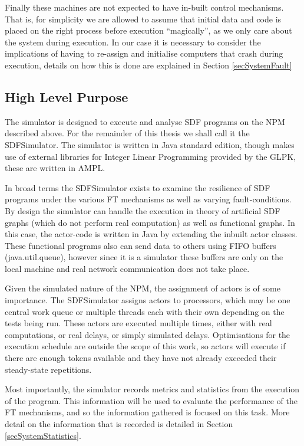 Finally these machines are not expected to have in-built control mechanisms.
That is, for simplicity we are allowed to assume that initial data and code is placed on the right process before execution ``magically'', as we only care about the system during execution.
In our case it is necessary to consider the implications of having to re-assign and initialise computers that crash during execution, details on how this is done are explained in Section \ref{secSystemFault}

\subsection{High Level Purpose}

The simulator is designed to execute and analyse SDF programs on the NPM described above.
For the remainder of this thesis we shall call it the SDFSimulator.
The simulator is written in Java standard edition, though makes use of external libraries for Integer Linear Programming provided by the GLPK, these are written in AMPL.

In broad terms the SDFSimulator exists to examine the resilience of SDF programs under the various FT mechanisms as well as varying fault-conditions.
By design the simulator can handle the execution in theory of artificial SDF graphs (which do not perform real computation) as well as functional graphs.
In this case, the actor-code is written in Java by extending the inbuilt actor classes.
These functional programs also can send data to others using FIFO buffers (java.util.queue), however since it is a simulator these buffers are only on the local machine and real network communication does not take place.

Given the simulated nature of the NPM, the assignment of actors is of some importance.
The SDFSimulator assigns actors to processors, which may be one central work queue or multiple threads each with their own depending on the tests being run.
These actors are executed multiple times, either with real computations, or real delays, or simply simulated delays.
Optimisations for the execution schedule are outside the scope of this work, so actors will execute if there are enough tokens available and they have not already exceeded their steady-state repetitions.

Most importantly, the simulator records metrics and statistics from the execution of the program.
This information will be used to evaluate the performance of the FT mechanisms, and so the information gathered is focused on this task.
More detail on the information that is recorded is detailed in Section \ref{secSystemStatistics}.

